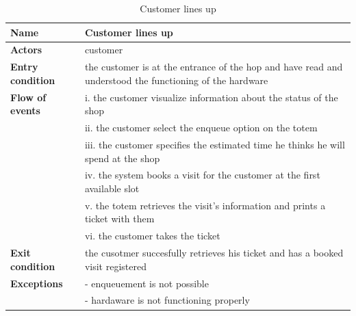 \begin{table}[h!]
    \centering
    \begin{tabular}{@{}P{0.2\textwidth}P{0.70\textwidth}@{}}
        \toprule
        \textbf{Name}                 & Customer lines up\\
        \midrule
        \textbf{Actors}               & customer\\
        \textbf{Entry condition}      & the customer is at the entrance of the hop and have read and understood the functioning of the hardware\\
        \textbf{Flow of events}            
        & i. the customer visualize information about the status of the shop\\
        & ii. the customer select the enqueue option on the totem\\
        & iii. the customer specifies the estimated time he thinks he will spend at the shop\\
        & iv. the system books a visit for the customer at the first available slot\\
        & v. the totem retrieves the visit's information and prints a ticket with them\\
        & vi. the customer takes the ticket\\
        \textbf{Exit condition}       & the cusotmer succesfully retrieves his ticket and has a booked visit registered\\
        \textbf{Exceptions}           
        & - enqueuement is not possible\\
        & - hardaware is not functioning properly\\
        \bottomrule
    \end{tabular}
\caption{Customer lines up}
\label{table:customerlinesup}
\end{table}

